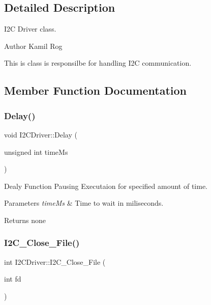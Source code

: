 \subsection{Detailed Description}
I2C Driver class. 

\begin{DoxyAuthor}{Author}
Kamil Rog
\end{DoxyAuthor}
This is class is responsilbe for handling I2C communication. 

\subsection{Member Function Documentation}
\mbox{\label{classI2CDriver_a01453a7adeb358f269faabb33953eee0}} 
\subsubsection{\texorpdfstring{Delay()}{Delay()}}
{\footnotesize\ttfamily void I2\+C\+Driver\+::\+Delay (\begin{DoxyParamCaption}\item[{unsigned int}]{time\+Ms }\end{DoxyParamCaption})}

Dealy Function Pausing Executaion for specified amount of time.


\begin{DoxyParams}{Parameters}
{\em time\+Ms} & Time to wait in miliseconds.\\
\hline
\end{DoxyParams}
\begin{DoxyReturn}{Returns}
none 
\end{DoxyReturn}
\mbox{\label{classI2CDriver_a6480a0e3e5022ac90944f319ca5a5f4e}} 
\subsubsection{\texorpdfstring{I2\+C\+\_\+\+Close\+\_\+\+File()}{I2C\_Close\_File()}}
{\footnotesize\ttfamily int I2\+C\+Driver\+::\+I2\+C\+\_\+\+Close\+\_\+\+File (\begin{DoxyParamCaption}\item[{int}]{fd }\end{DoxyParamCaption})}

